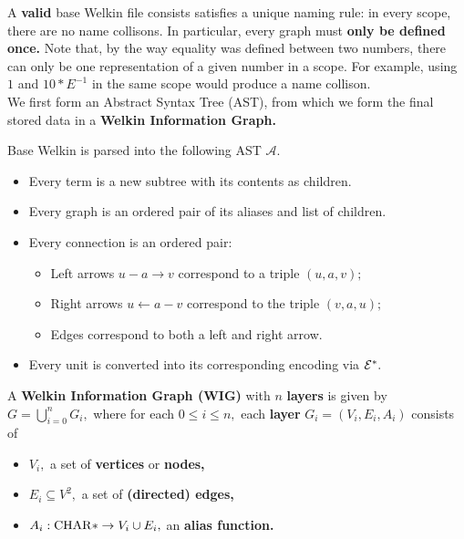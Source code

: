 A \textbf{valid} base Welkin file consists satisfies a unique naming rule: in every scope, there are no name collisons. In particular, every graph must \textbf{only be defined once.} Note that, by the way equality was defined between two numbers,
  there can only be one representation of a given number in a scope. For example, using $1$ and $10*E^{-1}$ in the same scope would produce a name collison.
\\ We first form an Abstract Syntax Tree (AST), from which we form the final stored data in a \textbf{Welkin Information Graph.}
\begin{definition}
  Base Welkin is parsed into the following AST $\mathcal{A}.$
  \begin{itemize}
	\item Every term is a new subtree with its contents as children.
    \item Every graph is an ordered pair of its aliases and list of children.
    \item Every connection is an ordered pair:
		  \begin{itemize}
			\item Left arrows $u - a \to v$ correspond to a triple $(u, a, v);$
			\item Right arrows $u \leftarrow a - v$ correspond to the triple $(v, a, u);$
			\item Edges correspond to both a left and right arrow.
		  \end{itemize}
	\item Every unit is converted into its corresponding encoding via $\mathcal{E}^{*}.$
  \end{itemize}
 \end{definition}
\begin{definition}
	A \textbf{Welkin Information Graph (WIG)} with $n$ \textbf{layers} is given by $G = \bigcup^{n}_{i=0}G_{i},$ where for each $0 \leq i \leq n,$ each \textbf{layer} $G_{i} = (V_{i}, E_{i}, A_{i})$ consists of
	\begin{itemize}
		\item $V_{i},$ a set of \textbf{vertices} or \textbf{nodes,}
		\item $E_{i} \subseteq V^{2},$ a set of \textbf{(directed) edges,}
		\item $A_{i}: \mathrm{CHAR}* \to V_{i} \cup E_{i},$ an \textbf{alias function.}
	\end{itemize}
  \end{definition}
